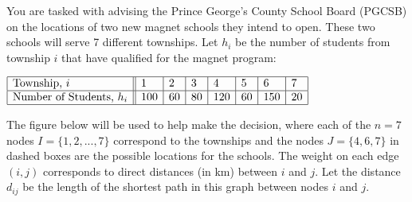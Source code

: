 


  You are tasked with advising the Prince George's County School Board (PGCSB) on the locations of two new magnet schools they intend to open. These two schools will serve 7 different townships. Let $h_i$ be the number of students from township $i$ that have qualified for the magnet program: 


	\begin{center}
$\begin{array}{| l || l | l| l| l| l|l|l|} \hline \text{Township, $i$} & 1 & 2 & 3 & 4 & 5 & 6 & 7 \\ \hline
\text{Number of Students, $h_i$} & 100 & 60 & 80 & 120 & 60 & 150 & 20 \\ \hline \end{array}	$
	\end{center}

The figure below will be used to help make the decision, where each of the $n=7$ nodes $I = \{1,2,...,7\}$ correspond to the townships and the nodes $J=\{4, 6, 7\}$ in dashed boxes are the possible locations for the schools. The weight on each edge $(i,j)$ corresponds to direct distances (in km) between $i$ and $j$.  Let the distance $d_{ij}$ be the length of the shortest path in this graph between nodes $i$ and $j$.  

